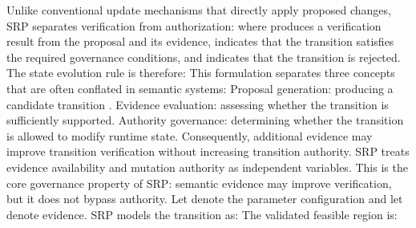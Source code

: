 {}Unlike conventional update mechanisms that directly apply proposed changes, SRP separates verification from authorization:\markdownRendererInterblockSeparator
{}\markdownRendererInterblockSeparator
{}where  produces a verification result from the proposal and its evidence,  indicates that the transition satisfies the required governance conditions, and  indicates that the transition is rejected.\markdownRendererParagraphSeparator
{}The state evolution rule is therefore:\markdownRendererInterblockSeparator
{}\markdownRendererInterblockSeparator
{}This formulation separates three concepts that are often conflated in semantic systems:\markdownRendererInterblockSeparator
{}\markdownRendererOlBeginTight
{}Proposal generation: producing a candidate transition .\markdownRendererOlItemEnd 
{}Evidence evaluation: assessing whether the transition is sufficiently supported.\markdownRendererOlItemEnd 
{}Authority governance: determining whether the transition is allowed to modify runtime state.\markdownRendererOlItemEnd 
\markdownRendererOlEndTight \markdownRendererInterblockSeparator
{}Consequently, additional evidence may improve transition verification without increasing transition authority. SRP treats evidence availability and mutation authority as independent variables.\markdownRendererParagraphSeparator
{}This is the core governance property of SRP: semantic evidence may improve verification, but it does not bypass authority.\markdownRendererInterblockSeparator
{}
\markdownRendererSectionEnd \markdownRendererSectionBegin
{}\markdownRendererInterblockSeparator
{}Let  denote the parameter configuration and let  denote evidence. SRP models the transition as:\markdownRendererInterblockSeparator
{}\markdownRendererInterblockSeparator
{}The validated feasible region is:\markdownRendererInterblockSeparator
{}\markdownRendererInterblockSeparator
